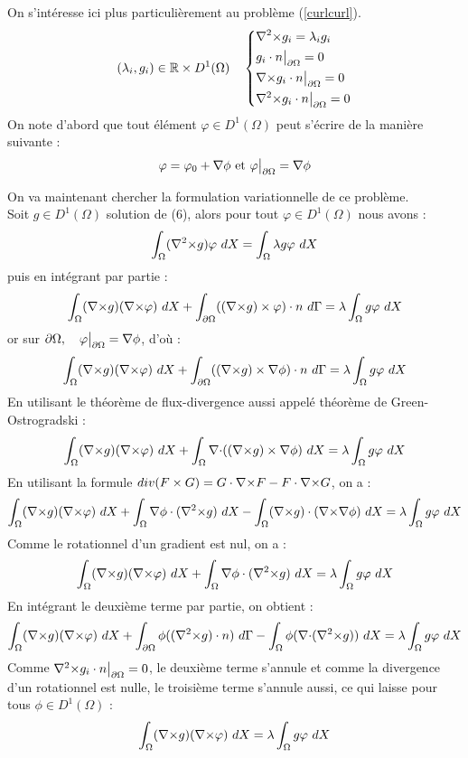 On s'intéresse ici plus particulièrement au problème (\ref{curlcurl}).
\begin{eqnarray*}
(\lambda_i,g_i)\in{\mathbb{R}}\times D^1(\Omega)\quad \left\{
\begin{aligned}
&{\nabla^2\times}  g_i = \lambda_i g_i\\
&g_i\cdot n{\big\rvert_{\partial\Omega}} = 0\\
&{\nabla\times} g_i\cdot n{\big\rvert_{\partial\Omega}} = 0\\
&{\nabla^2\times}  g_i\cdot n{\big\rvert_{\partial\Omega}} = 0
\end{aligned}
\right.
\end{eqnarray*}
On note d'abord que tout élément $\varphi\in D^1(\Omega)$ peut s'écrire de la manière suivante :
\[
\varphi = \varphi_0 + {\nabla}\phi\text{ et } \varphi{\big\rvert_{\partial\Omega}} = {\nabla}\phi
\]

On va maintenant chercher la formulation variationnelle de ce problème.\\
Soit $g\in D^1(\Omega)$ solution de (6), alors pour tout $\varphi\in D^1(\Omega)$ nous avons :
\[
\int_\Omega (\rott g)\varphi\ dX = \int_\Omega\lambda g\varphi\ dX
\]
puis en intégrant par partie :
\[
\int_\Omega (\rot g)(\rot\varphi)\ dX + \int_{\partial\Omega} ((\rot g)\times \varphi)\cdot n\ d\Gamma = \lambda\int_\Omega g\varphi\ dX
\]
or sur $\partial\Omega,\quad \varphi{\big\rvert_{\partial\Omega}}={\nabla}\phi$, d'où : 
\[
\int_\Omega ({\nabla\times} g)({\nabla\times}\varphi)\ dX + \int_{\partial\Omega} (({\nabla\times} g)\times {\nabla}\phi)\cdot n\ d\Gamma = \lambda\int_\Omega g\varphi\ dX
\]
En utilisant le théorème de flux-divergence aussi appelé théorème de Green-Ostrogradski :
\[
\int_\Omega ({\nabla\times} g)({\nabla\times}\varphi)\ dX + \int_\Omega {\nabla\cdot}(({\nabla\times} g)\times {\nabla}\phi)\ dX = \lambda\int_\Omega g\varphi\ dX
\]
En utilisant la formule $div(F\times G) = G\cdot {\nabla\times} F - F\cdot {\nabla\times} G$, on a :
\[
\int_\Omega ({\nabla\times} g)({\nabla\times}\varphi)\ dX + \int_\Omega {\nabla}\phi\cdot({\nabla^2\times} g)\ dX -\int_\Omega ({\nabla\times} g)\cdot ({\nabla\times}{\nabla}\phi)\ dX  = \lambda\int_\Omega g\varphi\ dX
\]
Comme le rotationnel d'un gradient est nul, on a :
\[
\int_\Omega (\rot g)(\rot\varphi)\ dX + \int_\Omega \grad\phi\cdot(\rott g)\ dX  = \lambda\int_\Omega g\varphi\ dX
\]
En intégrant le deuxième terme par partie, on obtient : 
\[
\int_\Omega ({\nabla\times} g)({\nabla\times}\varphi)\ dX + \int_{\partial\Omega} \phi(({\nabla^2\times} g)\cdot n)\ d\Gamma - \int_\Omega \phi({\nabla\cdot}({\nabla^2\times} g))\ dX  = \lambda\int_\Omega g\varphi\ dX
\]
Comme ${\nabla^2\times}  g_i\cdot n{\big\rvert_{\partial\Omega}} = 0$, le deuxième terme s'annule et comme la divergence d'un rotationnel est nulle, le troisième terme s'annule aussi, ce qui laisse pour tous $\phi\in D^1(\Omega)$ :
\begin{eqnarray}
\label{fveigen}
\int_\Omega ({\nabla\times} g)({\nabla\times}\varphi)\ dX = \lambda\int_\Omega g\varphi\ dX
\end{eqnarray}

